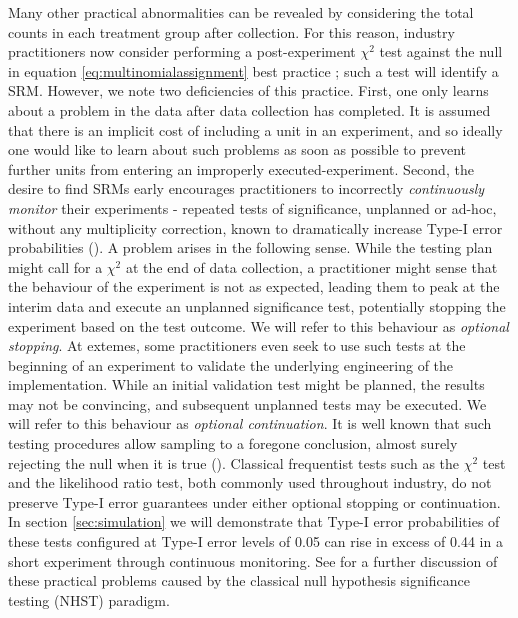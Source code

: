\documentclass[11pt]{article}
\begin{document}
Many other practical abnormalities can be revealed by considering the total counts in each treatment group after collection.
For this reason, industry practitioners now consider performing a post-experiment $\chi^2$ test against the null in equation \eqref{eq:multinomialassignment} best practice \citep{linkedin}; such a test will identify a SRM.
However, we note two deficiencies of this practice.
First, one only learns about a problem in the data after data collection has completed.
It is assumed that there is an implicit cost of including a unit in an experiment, and so ideally one would like to learn about such problems as soon as possible to prevent further units from entering an improperly executed-experiment.
Second, the desire to find SRMs early encourages practitioners to incorrectly \textit{continuously monitor} their experiments - repeated tests of significance, unplanned or ad-hoc, without any multiplicity correction, known to dramatically increase Type-I error probabilities (\cite{armitage}).
A problem arises in the following sense.
While the testing plan might call for a $\chi^2$ at the end of data collection, 
a practitioner might sense that the behaviour of the experiment is not as expected,
leading them to peak at the interim data and execute an unplanned significance test,
potentially stopping the experiment based on the test outcome.
We will refer to this behaviour as \textit{optional stopping}.
At extemes, some practitioners even seek to use such tests at the beginning of an experiment to validate the underlying engineering of the implementation.
While an initial validation test might be planned, the results may not be convincing, and subsequent unplanned tests may be executed.
We will refer to this behaviour as \textit{optional continuation}.
It is well known that such testing procedures allow sampling to a foregone conclusion, almost surely rejecting the null when it is true (\cite{anscombe}).
Classical frequentist tests such as the $\chi^2$ test and the likelihood ratio test, both commonly used throughout industry, do not preserve Type-I error guarantees
under either optional stopping or continuation.
In section \ref{sec:simulation} we will demonstrate that Type-I error probabilities of these tests configured at Type-I error levels of 0.05 can rise in excess of 0.44
in a short experiment through continuous monitoring.
See \cite{psychological} for a further discussion of these practical problems caused by the classical null hypothesis significance testing (NHST) paradigm.
\end{document}
